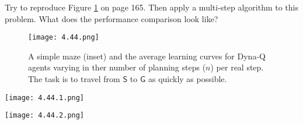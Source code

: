 
\begin{exercise}

Try to reproduce Figure \ref{fig:8.2} on page 165.
Then apply a multi-step algorithm to this problem.
What does the performance comparison look like?

\setcounter{section}{8}
\setcounter{figure}{1}

\begin{figure}[H]
    \centering
    \texttt{[image: 4.44.png]}
    \caption
    {
        A simple maze (inset) and the average learning curves for Dyna-Q agents varying in ther number of planning steps ($n$) per real step.
        The task is to travel from $\mathsf S$ to $\mathsf G$ as quickly as possible.
    }
    \label{fig:8.2}
\end{figure}

\end{exercise}


\begin{solution}

\phantom{}

\begin{center}
    \texttt{[image: 4.44.1.png]}
\end{center}

\begin{center}
    \texttt{[image: 4.44.2.png]}
\end{center}

\end{solution}

